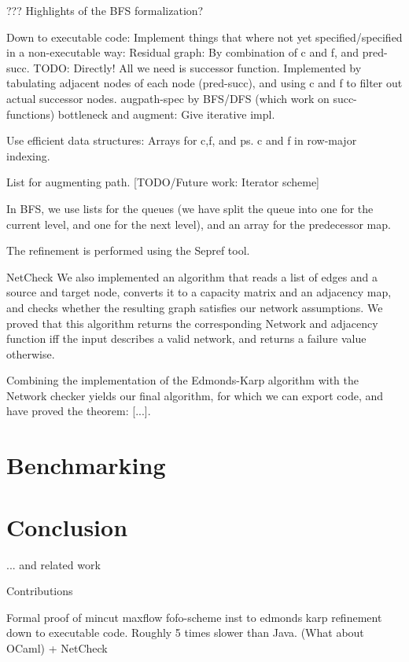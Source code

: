 \documentclass{llncs}
\begin{document}
        ??? Highlights of the BFS formalization?
    
  Down to executable code:
    Implement things that where not yet specified/specified in a non-executable way:
      Residual graph: By combination of c and f, and pred-succ. TODO: Directly!
        All we need is successor function. Implemented by tabulating 
          adjacent nodes of each node (pred-succ), and using c and f to filter out actual successor nodes. 
      augpath-spec by BFS/DFS (which work on succ-functions)
      bottleneck and augment: Give iterative impl.
      
    Use efficient data structures:
      Arrays for c,f, and ps. c and f in row-major indexing.
      
      List for augmenting path. [TODO/Future work: Iterator scheme]
  
      In BFS, we use lists for the queues (we have split the queue into one for 
        the current level, and one for the next level), and an array for the predecessor map. 
  
      The refinement is performed using the Sepref tool.

  NetCheck
    We also implemented an algorithm that reads a list of edges and a source and target node, 
    converts it to a capacity matrix and an adjacency map, and checks whether the resulting graph satisfies our network assumptions.
    We proved that this algorithm returns the corresponding Network and adjacency function iff the input describes a valid network,
    and returns a failure value otherwise.
    
  Combining the implementation of the Edmonds-Karp algorithm with the Network checker yields our final algorithm,
  for which we can export code, and have proved the theorem: [...]. 
    
    

\section{Benchmarking}
\section{Conclusion} 
  ... and related work


  
Contributions

  Formal proof of mincut maxflow
  fofo-scheme
  inst to edmonds karp
  refinement down to executable code. Roughly 5 times slower than Java. (What about OCaml)
    + NetCheck
    
\end{document}
